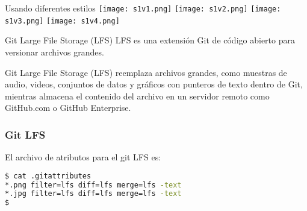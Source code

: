 \begin{frame}[c]{Usando diferentes estilos}
  \texttt{[image: s1v1.png]}
  \texttt{[image: s1v2.png]}
  \texttt{[image: s1v3.png]}
  \texttt{[image: s1v4.png]}
\end{frame}

\begin{frame}[c]{Git Large File Storage (LFS)}
  LFS es una extensión Git de código abierto para versionar archivos
  grandes.

  \vspace{\baselineskip}
  Git Large File Storage (LFS) reemplaza archivos grandes, como muestras
  de audio, videos, conjuntos de datos y gráficos con punteros de texto
  dentro de Git, mientras almacena el contenido del archivo en un servidor
  remoto como GitHub.com o GitHub Enterprise.
\end{frame}

\begin{frame}[fragile]
  \frametitle{Git LFS}
  El archivo de atributos para el git LFS es:
  \begin{lstlisting}[language=Bash,numbers=none]
$ cat .gitattributes
*.png filter=lfs diff=lfs merge=lfs -text
*.jpg filter=lfs diff=lfs merge=lfs -text
$
  \end{lstlisting}
\end{frame}

\begin{frame}[c]{}
  \pausa
  \vspace{\baselineskip}
\end{frame}

